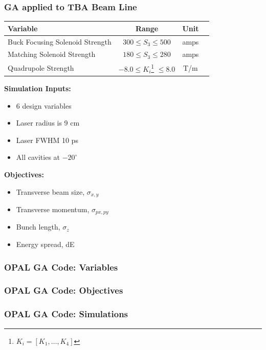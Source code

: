 \documentclass[professionalfonts,t]{beamer}
\newcommand\Wider[2][3em]{%
	\makebox[\linewidth][c]{%
		\begin{minipage}{\dimexpr\textwidth+#1\relax}
			\raggedright#2
		\end{minipage}%
	}%
}
\begin{document}
\begin{frame}
	\frametitle{GA applied to TBA Beam Line}
	\begin{center}
		\setcounter{mpfootnote}{\value{footnote}}%
		\renewcommand{\thempfootnote}{\arabic{mpfootnote}}%
		\begin{tabular}{ l *{3}{c}}
			\textbf{Variable} & \textbf{Range} & \textbf{Unit} \\
			\midrule
			Buck Focusing Solenoid Strength & $ 300 \le S_3 \le 500$  & amps \\
			Matching Solenoid Strength & $ 180 \le S_3 \le 280$  & amps \\
			Quadrupole Strength  & $-8.0 \le K_i$\footnote[1]{$K_i=[K_{1},\ldots,K_{4}]$}  $\le 8.0$ & T/m \\
		\end{tabular}
	\end{center}
\begin{minipage}{0.4\textwidth}
	\textbf{Simulation Inputs:}
	\begin{itemize}
		\item 6 design variables
		\item Laser radius is 9 cm
		\item Laser FWHM 10 ps
		\item All cavities at $-20^\circ$
	\end{itemize}
\end{minipage}
\begin{minipage}{0.55\textwidth}
	\textbf{Objectives:}
	\begin{itemize}
		\item Transverse beam size, $\sigma_{x,y}$
		\item Transverse momentum, $\sigma_{px,py}$
		\item Bunch length, $\sigma_z$
		\item Energy spread, dE
	\end{itemize}
\end{minipage}
\end{frame}

\begin{frame}
	\frametitle{OPAL GA Code: Variables}
	\centering
	\Wider[8em]{\tiny\lstVars}
\end{frame}
\begin{frame}
\frametitle{OPAL GA Code: Objectives}
\centering
\tiny\lstObjs
\end{frame}
\begin{frame}
\frametitle{OPAL GA Code: Simulations}
\begin{center}
	\Wider[8em]{\tiny\lstinfo}
\end{center}

\end{frame}
\end{document}
